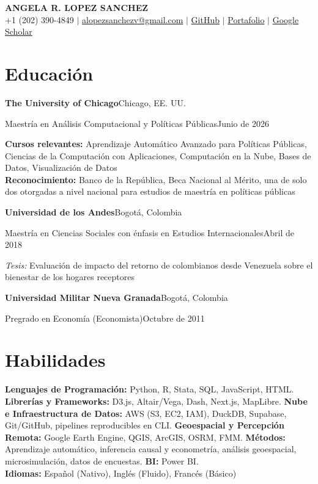 \documentclass[10pt]{article}
\newcommand{\org}[2]{\noindent\textbf{#1}\hfill #2\par\vspace{0pt}}
\newcommand{\edu}[2]{\noindent #1\hfill #2\par\vspace{0pt}}
\newcommand{\entrygap}{\vspace{6pt}}
\begin{document}

\begin{center}
  {\LARGE\textbf{ANGELA R. LOPEZ SANCHEZ}}\\[4pt]
  +1 (202) 390-4849 $|$
  \href{mailto:alopezsanchezv@gmail.com}{alopezsanchezv@gmail.com} $|$
  \href{https://github.com/AngelaLop}{GitHub} $|$
  \href{https://angelalop.github.io/AngelaLopezS/}{Portafolio} $|$
  \href{https://scholar.google.com/citations?user=wfO9incAAAAJ&hl=en}{Google Scholar}
\end{center}

\vspace{3pt}

\section{Educaci\'on}

\org{The University of Chicago}{Chicago, EE. UU.}
\edu{Maestr\'ia en An\'alisis Computacional y Pol\'iticas P\'ublicas}{Junio de 2026}
\textbf{Cursos relevantes:} Aprendizaje Autom\'atico Avanzado para Pol\'iticas P\'ublicas, Ciencias de la Computaci\'on con Aplicaciones, Computaci\'on en la Nube, Bases de Datos, Visualizaci\'on de Datos\\
\textbf{Reconocimiento:} Banco de la Rep\'ublica, Beca Nacional al M\'erito, una de solo dos otorgadas a nivel nacional para estudios de maestr\'ia en pol\'iticas p\'ublicas

\entrygap
\org{Universidad de los Andes}{Bogot\'a, Colombia}
\edu{Maestr\'ia en Ciencias Sociales con \'enfasis en Estudios Internacionales}{Abril de 2018}
\textit{Tesis:} Evaluaci\'on de impacto del retorno de colombianos desde Venezuela sobre el bienestar de los hogares receptores

\entrygap
\org{Universidad Militar Nueva Granada}{Bogot\'a, Colombia}
\edu{Pregrado en Econom\'ia (Economista)}{Octubre de 2011}

\section{Habilidades}

\textbf{Lenguajes de Programaci\'on:} Python, R, Stata, SQL, JavaScript, HTML.
\textbf{Librer\'ias y Frameworks:} D3.js, Altair/Vega, Dash, Next.js, MapLibre.
\textbf{Nube e Infraestructura de Datos:} AWS (S3, EC2, IAM), DuckDB, Supabase, Git/GitHub, pipelines reproducibles en CLI.
\textbf{Geoespacial y Percepci\'on Remota:} Google Earth Engine, QGIS, ArcGIS, OSRM, FMM.
\textbf{M\'etodos:} Aprendizaje autom\'atico, inferencia causal y econometr\'ia, an\'alisis geoespacial, microsimulaci\'on, datos de encuestas.
\textbf{BI:} Power BI.\\
\textbf{Idiomas:} Espa\~nol (Nativo), Ingl\'es (Fluido), Franc\'es (B\'asico)
\end{document}
